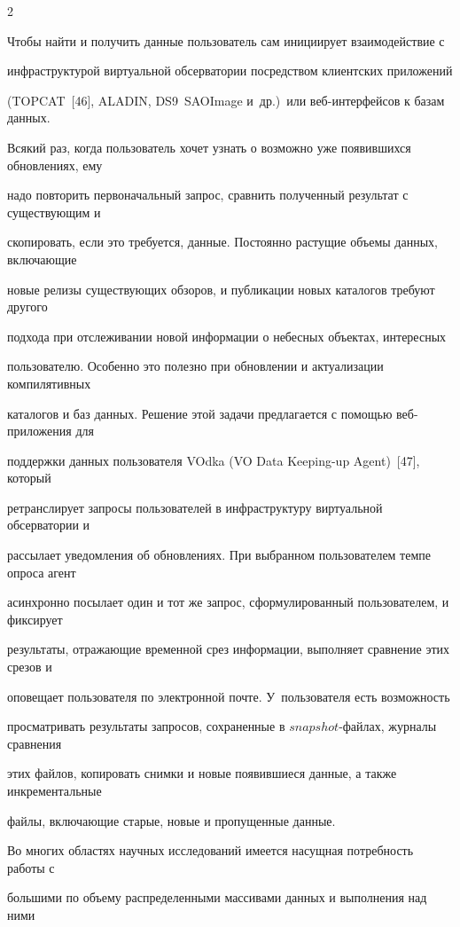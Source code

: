 \begin{multicols}{2}
      

      Чтобы найти и получить данные пользователь сам инициирует взаимодействие с 

инфраструктурой виртуальной обсерватории посредством клиентских приложений 

(TOPCAT~[46], ALADIN, DS9\ SAOImage и~др.)\ или веб-ин\-тер\-фей\-сов к базам данных. 

Всякий раз, когда пользователь хочет узнать о возможно уже появившихся обновлениях, ему 

надо повторить первоначальный запрос, сравнить полученный результат с существующим и 

скопировать, если это требуется, данные. Постоянно растущие объемы данных, включающие 

новые релизы существующих обзоров, и публикации новых каталогов требуют другого 

подхода при отслеживании новой информации о небесных объектах, интересных 

пользователю. Особенно это полезно при обновлении и актуализации компилятивных 

каталогов и баз данных. Решение этой задачи предлагается с по\-мощью веб-при\-ло\-же\-ния для 

поддержки данных пользователя \mbox{VOdka} ({VO Data Keeping-up Agent})~[47], который 

ретранслирует запросы пользователей в инфраструктуру виртуальной обсерватории и 

рассылает уведомления об обновлениях. При выбранном пользователем темпе опроса агент 

асинхронно посылает один и тот же запрос, сформулированный пользователем, и фиксирует 

результаты, отражающие временной срез информации, выполняет сравнение этих срезов и 

оповещает пользователя по электронной почте. У~пользователя есть возможность 

просматривать результаты запросов, сохраненные в $snapshot$-фай\-лах, журналы сравнения 

этих файлов, копировать снимки и новые появившиеся данные, а также инкрементальные 

файлы, включающие старые, новые и пропущенные данные.

      

      Во многих областях научных исследований имеется насущная потребность работы с 

большими по объему распределенными массивами данных и выполнения над ними 


\end{multicols}
